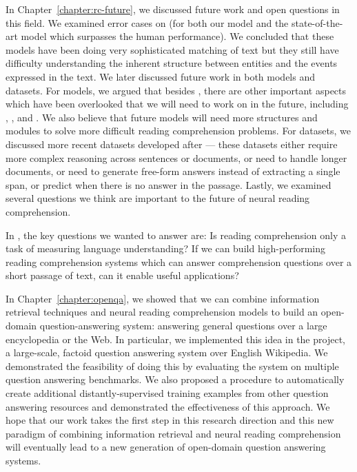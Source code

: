 In Chapter~\ref{chapter:rc-future}, we discussed future work and open questions in this field. We examined error cases on  (for both our model and the state-of-the-art model which surpasses the human performance). We concluded that these models have been doing very sophisticated matching of text but they still have difficulty understanding the inherent structure between entities and the events expressed in the text. We later discussed future work in both models and datasets. For models, we argued that besides , there are other important aspects which have been overlooked that we will need to work on in the future, including , , and . We also believe that future models will need more structures and modules to solve more difficult reading comprehension problems. For datasets, we discussed more recent datasets developed after  --- these datasets either require more complex reasoning across sentences or documents, or need to handle longer documents, or need to generate free-form answers instead of extracting a single span, or predict when there is no answer in the passage. Lastly, we examined several questions we think are important to the future of neural reading comprehension.

In , the key questions we wanted to answer are: Is reading comprehension only a task of measuring language understanding? If we can build high-performing reading comprehension systems which can answer comprehension questions over a short passage of text, can it enable useful applications?

In Chapter~\ref{chapter:openqa}, we showed that we can combine information retrieval techniques and neural reading comprehension
models to build an open-domain question-answering system: answering general questions over a large encyclopedia or the Web. In particular, we implemented this idea in the  project, a large-scale, factoid question answering system over English Wikipedia. We demonstrated the feasibility of doing this by evaluating the system on multiple question answering benchmarks. We also proposed a procedure to automatically create additional distantly-supervised training examples from other question answering resources and demonstrated the effectiveness of this approach. We hope that our work takes the first step in this research direction and this new paradigm of combining information retrieval and neural reading comprehension will eventually lead to a new generation of open-domain question answering systems.

